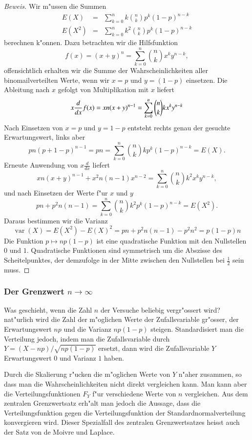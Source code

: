 \begin{proof}[Beweis] Wir m"ussen die Summen
\begin{eqnarray*}
E(X)&=&\sum_{k=0}^nk\binom{n}{k}p^k(1-p)^{n-k}\\
E(X^2)&=&\sum_{k=0}^nk^2\binom{n}{k}p^k(1-p)^{n-k}
\end{eqnarray*}
berechnen k"onnen. Dazu betrachten wir die Hilfsfunktion
\[
f(x)=(x+y)^n=\sum_{k=0}^n\binom{n}{k}x^ky^{n-k},
\]
offensichtlich erhalten wir die Summe der Wahrscheinlichkeiten aller
binomailverteilten Werte, wenn
wir $x=p$ und $y=(1-p)$ einsetzen.
Die Ableitung nach $x$ gefolgt von Multiplikation mit $x$ liefert
\[
 x\frac{d}{dx}f(x)
=xn(x+y)^{n-1}\\
=\sum_{k=0}^n\binom{n}{k}kx^ky^{n-k}
\]
Nach Einsetzen von $x=p$ und $y=1-p$ entsteht rechts genau
der gesuchte Erwartungswert, links aber
\[
pn(p+1-p)^{n-1}=pn=\sum_{k=0}^n\binom{n}{k}kp^k(1-p)^{n-k}=E(X).
\]
Erneute Anwendung von $x\frac{d}{dx}$ liefert
\[
xn(x+y)^{n-1}+x^2 n(n-1)x^{n-2}=\sum_{k=0}^n\binom{n}{k}k^2x^ky^{n-k},
\]
und nach Einsetzen der Werte f"ur $x$ und $y$
\[
pn+p^2n(n-1)=\sum_{k=0}^n\binom{n}{k}k^2p^k(1-p)^{n-k}=E(X^2).
\]
Daraus bestimmen wir die Varianz
\[
\operatorname{var}(X)=E(X^2)-E(X)^2=pn+p^2n(n-1)-p^2n^2=p(1-p)n
\]
Die Funktion $p\mapsto np(1-p)$ ist eine quadratische Funktion mit den
Nullstellen $0$ und $1$. Quadratische Funktionen sind symmetrisch um
die Abszisse des Scheitelpunktes, der demzufolge in der Mitte zwischen
den Nullstellen bei $\frac12$ sein muss.
\end{proof}

\subsubsection{Der Grenzwert \texorpdfstring{$n\to\infty$}{n gegen unendlich}}
Was geschieht, wenn die Zahl $n$ der Versuche beliebig vergr"ossert wird?
nat"urlich wird die Zahl der m"oglichen Werte der Zufallsvariable
gr"osser, der Erwartungswert $np$ und die Varianz $np(1-p)$ steigen.
Standardisiert man die Verteilung jedoch, indem man die Zufallsvariable
durch $Y=(X-np)/\sqrt{np(1-p)}$ ersetzt, dann wird die Zufallsvariable $Y$
Erwartungswert $0$ und Varianz $1$ haben. 

Durch die Skalierung r"ucken die m"oglichen Werte von $Y$ n"aher zusammen,
so dass man die Wahrscheinlichkeiten nicht direkt vergleichen kann.
Man kann aber die Verteilungsfunktionen $F_Y$ f"ur verschiedene Werte
von $n$ vergleichen. Aus dem zentralen Grenzwertsatz erh"alt man
jedoch die Aussage, dass die Verteilungsfunktion gegen die
Verteilungsfunktion der Standardnormalverteilung konvergieren wird.
Dieser Spezialfall des zentralen Grenzwertsatzes heisst auch der
Satz von de Moivre und Laplace.

